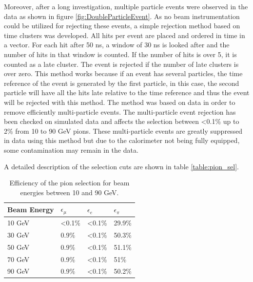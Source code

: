 Moreover, after a long investigation, multiple particle events were observed in the data as shown in figure \ref{fig:DoubleParticleEvent}. As no beam instrumentation could be utilized for rejecting these events, a simple rejection method based on time clusters was developed. All hits per event are placed and ordered in time in a vector. For each hit after 50 ns, a window of 30 ns is looked after and the number of hits in that window is counted. If the number of hits is over 5, it is counted as a late cluster. The event is rejected if the number of late clusters is over zero. This method works because if an event has several particles, the time reference of the event is generated by the first particle, in this case, the second particle will have all the hits late relative to the time reference and thus the event will be rejected with this method. The method was based on data in order to remove efficiently multi-particle events. The multi-particle event rejection has been checked on simulated data and affects the selection between <0.1\% up to 2\% from 10 to 90 GeV pions.
These multi-particle events are greatly suppressed in data using this method but due to the calorimeter not being fully equipped, some contamination may remain in the data.

A detailed description of the selection cuts are shown in table \ref{table:pion_sel}.

\begin{table}[htb!]
	\centering
	\caption{Efficiency of the pion selection for beam energies between 10 and 90 GeV.}
	\label{table:eff_pion}
	\begin{tabular}{@{} llll @{}}
		\hline
		\textbf{Beam Energy} & \textbf{$\epsilon_{\mu}$} & \textbf{$\epsilon_{e}$} & \textbf{$\epsilon_{\pi}$}\\
		\hline
		10 GeV & <0.1\% & <0.1\% & 29.9\%\\
		30 GeV & 0.9\% & <0.1\% & 50.3\%\\
		50 GeV & 0.9\% & <0.1\% & 51.1\%\\
		70 GeV & 0.9\% & <0.1\% & 51\%\\
		90 GeV & 0.9\% & <0.1\% & 50.2\%\\
		\hline
	\end{tabular}
\end{table}

